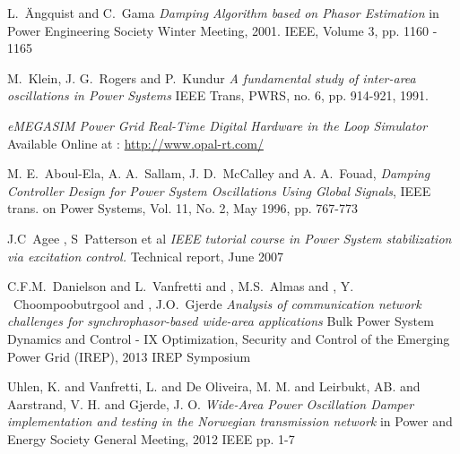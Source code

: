 \documentclass[journal]{IEEEtran}
\begin{document}
%
%
%
\begin{thebibliography}{1}

L.~\"{A}ngquist and C.~Gama  \emph{Damping Algorithm based on Phasor Estimation} in Power Engineering Society Winter Meeting, 2001. IEEE, Volume 3, pp. 1160 - 1165  

M.~Klein, J. G.~Rogers and P.~Kundur \emph{A fundamental study of inter-area oscillations in Power Systems} IEEE Trans, PWRS, no. 6, pp. 914-921, 1991. 

 \emph{eMEGASIM Power Grid Real-Time Digital Hardware in the Loop Simulator} Available Online at : \url{http://www.opal-rt.com/}

  
  M. E.~Aboul-Ela, A. A.~Sallam, J. D.~McCalley and A. A.~Fouad, \emph{Damping Controller Design for Power System Oscillations Using Global Signals}, IEEE trans. on Power Systems, Vol. 11, No. 2, May 1996, pp. 767-773

 J.C~Agee , S~Patterson et al \emph{IEEE tutorial course in Power System stabilization via excitation control.} Technical report, June 2007

 C.F.M.~Danielson and L.~Vanfretti and , M.S.~Almas and , Y. ~Choompoobutrgool and , J.O.~Gjerde \emph{Analysis of communication network challenges for synchrophasor-based wide-area applications} Bulk Power System Dynamics and Control - IX Optimization, Security and Control of the Emerging Power Grid (IREP), 2013 IREP Symposium

 Uhlen, K. and Vanfretti, L. and De Oliveira, M. M. and Leirbukt, AB. and Aarstrand, V. H. and Gjerde, J. O. \emph{Wide-Area Power Oscillation Damper implementation and testing in the Norwegian transmission network} in Power and Energy Society General Meeting, 2012 IEEE pp. 1-7


\end{thebibliography}
\end{document}
